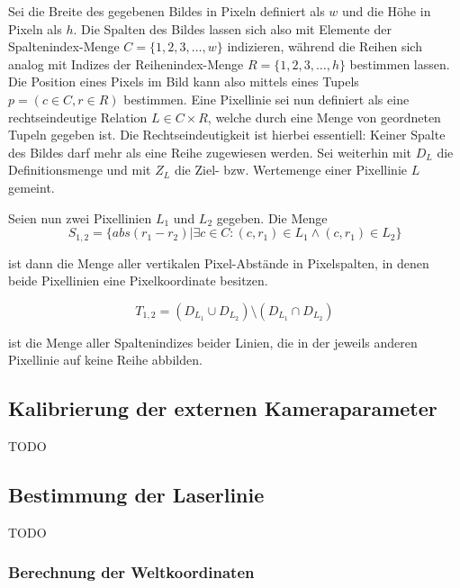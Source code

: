 Sei die Breite des gegebenen Bildes in Pixeln definiert als \(w\) und die Höhe in Pixeln als \(h\). Die Spalten des Bildes  lassen sich also mit Elemente der Spaltenindex-Menge \(C = \lbrace 1, 2, 3, \ldots , w \rbrace\) indizieren, während  die Reihen sich analog mit Indizes der Reihenindex-Menge \(R = \lbrace 1, 2, 3, \ldots , h \rbrace\) bestimmen lassen. Die Position eines Pixels im Bild kann also mittels eines Tupels \(p = (c \in C, r \in R)\) bestimmen. Eine Pixellinie sei nun definiert als eine rechtseindeutige Relation \(L \in C \times R\), welche durch eine Menge von geordneten Tupeln gegeben ist.
Die Rechtseindeutigkeit ist hierbei essentiell: Keiner Spalte des Bildes darf mehr als eine Reihe zugewiesen werden. Sei weiterhin mit \(D_{L}\) die Definitionsmenge und mit \(Z_{L}\) die Ziel- bzw. Wertemenge einer Pixellinie \(L\) gemeint.\newline

Seien nun zwei Pixellinien \(L_{1}\) und \(L_{2}\) gegeben. Die Menge
\begin{equation}
S_{1,2} = \lbrace abs(r_{1} - r_{2}) | \exists c \in C: (c, r_{1}) \in L_{1} \wedge (c, r_{1}) \in L_{2} \rbrace
\end{equation}

ist dann die Menge aller vertikalen Pixel-Abstände in Pixelspalten, in denen beide Pixellinien eine Pixelkoordinate besitzen. 

\begin{equation}
T_{1,2} = (D_{L_{1}} \cup D_{L_{2}}) \setminus (D_{L_{1}} \cap D_{L_{2}})   
\end{equation}   

ist die Menge aller Spaltenindizes beider Linien, die in der jeweils anderen Pixellinie auf keine Reihe abbilden.



\subsection{Kalibrierung der externen Kameraparameter}
\label{subsec:externeKalibrierung}
TODO

\subsection{Bestimmung der Laserlinie}
\label{subsec:LaserLinieBestimmung}
TODO

\subsubsection{Berechnung der Weltkoordinaten}